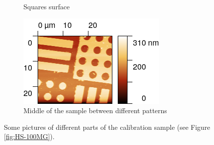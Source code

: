 \documentclass[11pt,a4paper]{article}
\begin{document}
\begin{figure}[H]
\begin{subfigure}[b]{0.45\textwidth}
\caption{Squares surface}
\end{subfigure}
\begin{subfigure}[b]{0.45\textwidth}
\includegraphics[width=\textwidth]{sm_border}
\caption{Middle of the sample between different patterns}
\end{subfigure}
\caption{Some pictures of different parts of the calibration sample (see Figure \ref{fig:HS-100MG}).}
\label{fig:static_calibration_grid}
\end{figure}
\end{document}
